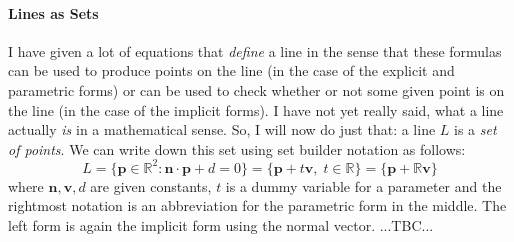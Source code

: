 \paragraph{Lines as Sets}
I have given a lot of equations that \emph{define} a line in the sense that these formulas can be used to produce points on the line (in the case of the explicit and parametric forms) or can be used to check whether or not some given point is on the line (in the case of the implicit forms). I have not yet really said, what a line actually \emph{is} in a mathematical sense. So, I will now do just that: a line $L$ is a \emph{set of points}. We can write down this set using set builder notation as follows: 
\begin{equation}
L = \{ \mathbf{p} \in \mathbb{R}^2 : \mathbf{n} \cdot \mathbf{p} + d = 0 \}
  = \{ \mathbf{p} + t \mathbf{v}, \; t \in \mathbb{R}  \}
  = \{\mathbf{p} + \mathbb{R} \mathbf{v} \} 
\end{equation}
where $\mathbf{n}, \mathbf{v}, d$ are given constants, $t$ is a dummy variable for a parameter and the rightmost notation is an abbreviation for the parametric form in the middle. The left form is again the implicit form using the normal vector.
...TBC...

